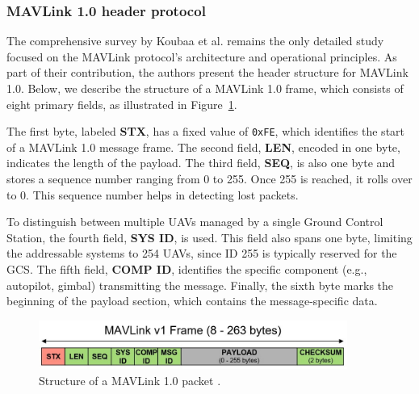 \subsubsection{MAVLink 1.0 header protocol}


The comprehensive survey by Koubaa et al. \cite{koubaa2017mavlink} remains the only detailed study focused on the MAVLink protocol’s architecture and operational principles. As part of their contribution, the authors present the header structure for MAVLink 1.0. Below, we describe the structure of a MAVLink 1.0 frame, which consists of eight primary fields, as illustrated in Figure~\ref{fig:mavlink-v1-packet}.

The first byte, labeled \textbf{STX}, has a fixed value of \texttt{0xFE}, which identifies the start of a MAVLink 1.0 message frame. The second field, \textbf{LEN}, encoded in one byte, indicates the length of the payload. The third field, \textbf{SEQ}, is also one byte and stores a sequence number ranging from 0 to 255. Once 255 is reached, it rolls over to 0. This sequence number helps in detecting lost packets.

To distinguish between multiple UAVs managed by a single Ground Control Station, the fourth field, \textbf{SYS ID}, is used. This field also spans one byte, limiting the addressable systems to 254 UAVs, since ID 255 is typically reserved for the GCS. The fifth field, \textbf{COMP ID}, identifies the specific component (e.g., autopilot, gimbal) transmitting the message. Finally, the sixth byte marks the beginning of the payload section, which contains the message-specific data.

\begin{figure}[ht]
\centering
\includegraphics[width=0.9\textwidth]{Figures/Chapter1/Section4/1.jpg} %
\caption{Structure of a MAVLink 1.0 packet \cite{mavlinkio}.}
\label{fig:mavlink-v1-packet}
\end{figure}





